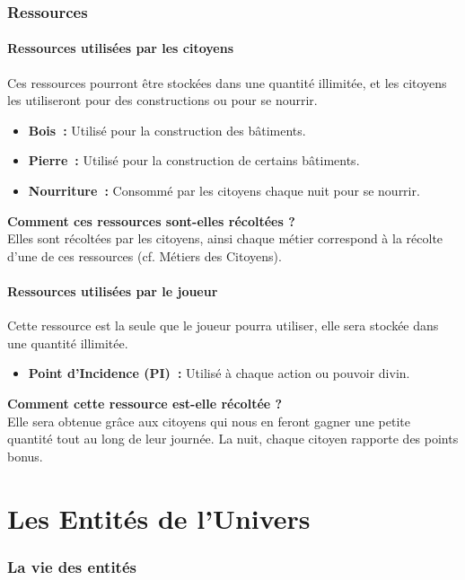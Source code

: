 \documentclass[a4paper]{article}
\begin{document}

    \section{Ressources}

      \subsection{Ressources utilisées par les citoyens}
        Ces ressources pourront être stockées dans une quantité illimitée, et les citoyens les utiliseront pour des constructions ou pour se nourrir.
        \begin{itemize}
          \item \textbf{Bois :} \small{ Utilisé pour la construction des bâtiments.}
          \item \textbf{Pierre :} \small{ Utilisé pour la construction de certains bâtiments.}
          \item \textbf{Nourriture :} \small{ Consommé par les citoyens chaque nuit pour se nourrir.}
        \end{itemize}
        \textbf{Comment ces ressources sont-elles récoltées ? }\\Elles sont récoltées par les citoyens, ainsi chaque métier correspond à la récolte d'une de ces ressources (cf. Métiers des Citoyens).

      \subsection{Ressources utilisées par le joueur}
        Cette ressource est la seule que le joueur pourra utiliser, elle sera stockée dans une quantité illimitée.
        \begin{itemize}
          \item \textbf{Point d'Incidence (PI) :} \small{ Utilisé à chaque action ou pouvoir divin.}
        \end{itemize}
        \textbf{Comment cette ressource est-elle récoltée ? }\\Elle sera obtenue grâce aux citoyens qui nous en feront gagner une petite quantité tout au long de leur journée. La nuit, chaque citoyen rapporte des points bonus.


  \part{Les Entités de l'Univers}
    \section{La vie des entités}
\end{document}
